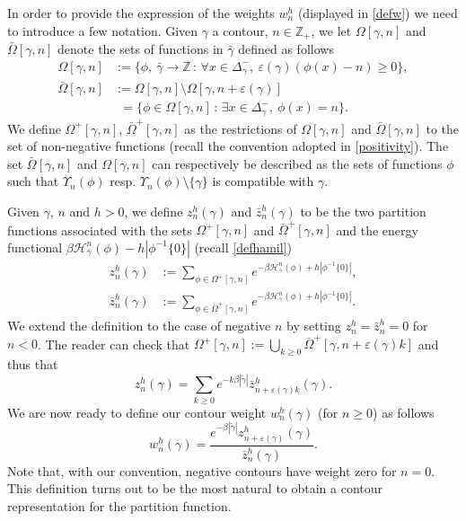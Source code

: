 \documentclass[10pt]{amsart}
\let\mathcal\mathscr
\newcommand{\sep}{\,:\,}
\numberwithin{equation}{section}
\theoremstyle{plain}
\theoremstyle{definition}
\newcommand{\cH}{{\ensuremath{\mathcal H}} }
\newcommand{\bbZ}{{\ensuremath{\mathbb Z}} }
\newcommand{\gb}{\beta}
\newcommand{\gep}{\varepsilon}
\newcommand{\gO}{\Omega}
\begin{document}
In order to provide the expression of the weights $w^h_n$ (displayed in \eqref{defw}) we need to introduce a few notation.
Given $\gamma$ a contour, $n\in \bbZ_+$, we let $\gO[\gamma,n]$ and $\bar \gO[\gamma,n]$ denote the sets of functions in $\bar \gamma$ defined as follows
\begin{equation}\label{defoom}
\begin{split}
\gO[\gamma,n]&:=\{\phi,\ \bar \gamma \rightarrow \bbZ \sep \forall x\in \Delta^-_{\gamma},\ \gep(\gamma)(\phi(x)-n)\ge 0\},\\
\bar \gO[\gamma,n]&:=\gO[\gamma,n]\setminus \gO[\gamma,n+\gep(\gamma)]\\
&\phantom{:}= \{ \phi \in \gO[\gamma,n] \sep \exists x\in \Delta^-_{\gamma},\ \phi(x)=n\}.
\end{split}
\end{equation}
We define $\gO^+[\gamma,n]$, $\bar \gO^+[\gamma,n]$ as the restrictions of $\gO[\gamma,n]$ and $\bar \gO[\gamma,n]$ to the set of non-negative functions
(recall the convention adopted in
\eqref{positivity}).
The set $\bar \gO[\gamma,n]$ and $\gO[\gamma,n]$ can respectively be described as the sets of functions
$\phi$ such that $\Upsilon_n(\phi)$ resp. $\Upsilon_n(\phi)\setminus \{\gamma\}$
is compatible with $\gamma$.

Given $\gamma$, $n$ and $h>0$, we define $z^{h}_n(\gamma)$ and $\bar z^h_n(\gamma)$
to be the two partition functions associated with the sets $\gO^+[\gamma,n]$ and $\bar \gO^+[\gamma,n]$ and the energy functional
$\gb \cH^n_{\bar \gamma}(\phi)-h|\phi^{-1}\{0\}|$ (recall \eqref{defhamil})
\begin{equation}\label{partisioux}\begin{split}
z^h_n(\gamma)&:= \sum_{\phi\in \gO^+[\gamma,n]} e^{-\gb \cH^n_{\bar \gamma}(\phi)+h |\phi^{-1}\{0\}|},\\
\bar z^h_n(\gamma)&:= \sum_{\phi\in \bar \gO^+[\gamma,n]} e^{-\gb \cH^n_{\bar \gamma}(\phi)+h|\phi^{-1}\{0\}|}.
\end{split}\end{equation}
We extend the definition to the case of negative $n$ by setting $z^h_n=\bar z^h_n=0$ for $n<0$.
The reader can check that $\gO^+[\gamma,n]:=\bigcup_{k\ge 0}\bar\gO^+[\gamma,n+\gep(\gamma)k]$ and thus that
\begin{equation}\label{relatz}
z^h_n(\gamma)= \sum_{k\ge 0} e^{-k \gb|\tilde \gamma|}\bar z^h_{n+\gep(\gamma)k}(\gamma).
\end{equation}
We are now ready to define our contour weight $w^h_n(\gamma)$ (for $n\ge 0$) as follows
\begin{equation}\label{defw}
w^h_n(\gamma)= \frac{ e^{-\gb|\tilde \gamma|} z^h_{n+\gep(\gamma)}(\gamma)}{\bar z^h_n(\gamma)}.
\end{equation}
Note that, with our convention, negative contours have weight zero for $n=0$.
This definition turns out to be the most natural to obtain a contour representation for the partition function.
\end{document}
